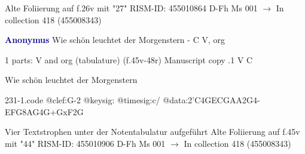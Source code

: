 \documentclass[twocolumn]{book}
\begin{document}
\newline Alte Foliierung auf f.26v mit "27"
\newline RISM-ID: 455010864
\newline D-Fh  Ms 001
\newline $\rightarrow$ In collection 418 (455008343)
      
\newline \par \vspace{7pt} \textcolor{darkblue}{\textbf{Anonymus  }}
\newline Wie schön leuchtet der Morgenstern - C
\newline V, org
\newline \begin{itshape}\end{itshape} 
\newline \textcolor{darkblue}{}  1 parts: V and org (tabulature)  (f.45v-48r)
\newline Manuscript copy
.1  V  C
\newline \begin{footnotesize} Wie schön leuchtet der Morgenstern \end{footnotesize}  
\begin{filecontents*}{231-1.code}
@clef:G-2
@keysig:
@timesig:c/
@data:2'C4GECGAA2G4-EFG{8AG}4G+GxF2G
\end{filecontents*}
\newline
%

\newline Vier Textstrophen unter der Notentabulatur aufgeführt
\newline Alte Foliierung auf f.45v mit "44"
\newline RISM-ID: 455010906
\newline D-Fh  Ms 001
\newline $\rightarrow$ In collection 418 (455008343)
      
\end{document}
